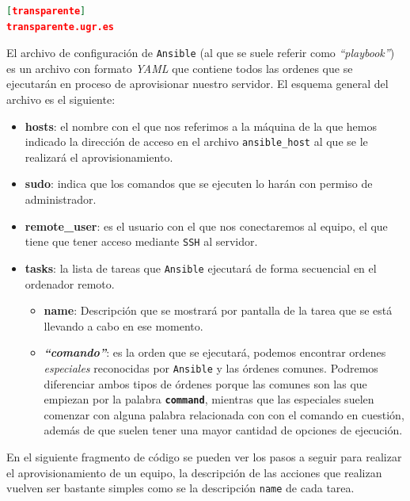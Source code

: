 \begin{lstlisting}[language=json,caption={Archivo de hosts},label={lst:hosts}]
[transparente]
transparente.ugr.es
\end{lstlisting}

El archivo de configuración de {\tt Ansible} (al que se suele referir como \textit{``playbook''}) es un archivo con formato \textit{YAML} que contiene todos las ordenes que se ejecutarán en proceso de aprovisionar nuestro servidor. El esquema general del archivo es el siguiente:

\begin{itemize}
	\item \textbf{hosts}: el nombre con el que nos referimos a la máquina de la que hemos indicado la dirección de acceso en el archivo {\tt ansible\_host} al que se le realizará el aprovisionamiento.
	\item \textbf{sudo}: indica que los comandos que se ejecuten lo harán con permiso de administrador.
	\item \textbf{remote\_user}: es el usuario con el que nos conectaremos al equipo, el que tiene que tener acceso mediante {\tt SSH} al servidor.
	\item \textbf{tasks}: la lista de tareas que {\tt Ansible} ejecutará de forma secuencial en el ordenador remoto.
	\begin{itemize}
		\item \textbf{name}: Descripción que se mostrará por pantalla de la tarea que se está llevando a cabo en ese momento.
		\item \textbf{\textit{``comando''}}: es la orden que se ejecutará, podemos encontrar ordenes \textit{especiales} reconocidas por {\tt Ansible} y las órdenes comunes. Podremos diferenciar ambos tipos de órdenes porque las comunes son las que empiezan por la palabra \textbf{\tt command}, mientras que las especiales suelen comenzar con alguna palabra relacionada con con el comando en cuestión, además de que suelen tener una mayor cantidad de opciones de ejecución.
	\end{itemize}
\end{itemize}

En el siguiente fragmento de código se pueden ver los pasos a seguir para realizar el aprovisionamiento de un equipo, la descripción de las acciones que realizan vuelven ser bastante simples como se la descripción {\tt name} de cada tarea.

